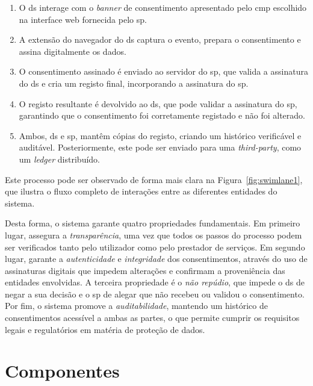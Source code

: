 \begin{enumerate}
    \item O \acrshort{ds} interage com o \textit{banner} de consentimento apresentado pelo \acrshort{cmp} escolhido na interface web fornecida pelo \acrshort{sp}.
    \item A extensão do navegador do \acrshort{ds} captura o evento, prepara o consentimento e assina digitalmente os dados.
    \item O consentimento assinado é enviado ao servidor do \acrshort{sp}, que valida a assinatura do \acrshort{ds} e cria um registo final, incorporando a assinatura do \acrshort{sp}.
    \item O registo resultante é devolvido ao \acrshort{ds}, que pode validar a assinatura do \acrshort{sp}, garantindo que o consentimento foi corretamente registado e não foi alterado.
    \item Ambos, \acrshort{ds} e \acrshort{sp}, mantêm cópias do registo, criando um histórico verificável e auditável. Posteriormente, este pode ser enviado para uma \textit{third-party}, como um \textit{ledger} distribuído.
\end{enumerate}

Este processo pode ser observado de forma mais clara na Figura~\ref{fig:swimlane1}, que ilustra o fluxo completo de interações entre as diferentes entidades do sistema.

Desta forma, o sistema garante quatro propriedades fundamentais. Em primeiro lugar, assegura a \textit{transparência}, uma vez que todos os passos do processo podem ser verificados tanto pelo utilizador como pelo prestador de serviços. Em segundo lugar, garante a \textit{autenticidade} e \textit{integridade} dos consentimentos, através do uso de assinaturas digitais que impedem alterações e confirmam a proveniência das entidades envolvidas. A terceira propriedade é o \textit{não repúdio}, que impede o \acrshort{ds} de negar a sua decisão e o \acrshort{sp} de alegar que não recebeu ou validou o consentimento. Por fim, o sistema promove a \textit{auditabilidade}, mantendo um histórico de consentimentos acessível a ambas as partes, o que permite cumprir os requisitos legais e regulatórios em matéria de proteção de dados.

\section{Componentes}

